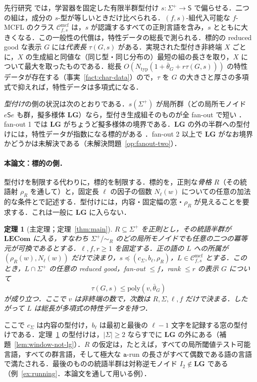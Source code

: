 \documentclass[11pt,a4paper]{ltjsarticle}
\numberwithin{equation}{section}
\theoremstyle{plain}
\theoremstyle{definition}
\theoremstyle{remark}
\theoremstyle{plain}
\newtheorem{mainthm}{定理}
\newcommand{\Cmcf}[2]{\mathcal{C}^{\mathrm{mcf}}_{#1,#2}}
\newcommand{\LG}{\mathbf{LG}}
\newcommand{\LECom}{\mathbf{L}\mathbf{ECom}}
\newcommand{\bth}{\bar\theta}
\begin{document}
先行研究 \cite{KuriyamaTCS1,KuriyamaMCFGpreprint,KuriyamaCompendium} では，学習器を固定した有限半群型付け $s:\Sigma^+\to\mathsf S$ で偏らせる．二つの組は，成分の $s$-型が等しいときだけ比べられる．$(f,s)$-組代入可能な $f$-MCFL のクラス $\Cmcf{f}{s}$ は，$s$ が認識するすべての正則言語を含み，$s$ とともに大きくなる．この一般性の代償は，特性データの総長で測られる．標的の reduced good な表示 $G$ には\emph{代表長} $\tau(G,s)$ がある．実現された型付き非終端 $X$ ごとに，$X$ の生成組と同値な（同じ型・同じ分布の）最短の組の長さを取り，$X$ について最大を取ったものである．総長 $O(N_{\mathrm{typ}}(1+\bth_G+r\tau(G,s)))$ の特性データが存在する（事実~\ref{fact:char-data}）ので，$\tau$ を $G$ の大きさと厚さの多項式で抑えれば，特性データは多項式になる．

\emph{型付け}の側の状況は次のとおりである．$s(\Sigma^+)$ が局所群（どの局所モノイド $e\mathsf Se$ も群，擬多様体 $\LG$）なら，型付き生成組そのものが全 fan-out で短い \cite{KuriyamaCompendium}．fan-out 1 では $\LG$ がちょうど擬多様体の境界である．$\LG$ の外の半群への型付けには，特性データが指数になる標的がある \cite{KuriyamaTCS1,KuriyamaTypingClass}．fan-out 2 以上で $\LG$ がなお境界かどうかは未解決である（未解決問題~\ref{op:fanout-two}）．

\paragraph{本論文：標的の側．}
型付けを制限する代わりに，標的を制限する．標的を，正則な\emph{骨格} $R$（その統語射 $\rho_R$ を通して）と，固定長 $\ell$ の因子の個数 $N_\ell(w)$ についての任意の加法的な条件とで記述する．型付けには，内容・固定幅の窓・$\rho_R$ が見えることを要求する．これは一般に $\LG$ に入らない．

\begin{mainthm}[主定理；定理~\ref{thm:main}]
\label{thm:A}
$R\subseteq\Sigma^+$ を正則とし，その統語半群が $\LECom$ に入る，すなわち $\Sigma^+/{\sim_R}$ のどの局所モノイドでも任意の二つの冪等元が可換であるとする．$\ell,f,r\ge1$ を固定する．正の語の $L$ への所属が $(\rho_R(w),N_\ell(w))$ だけで決まり，$s\preceq(c_\Sigma,b_\ell,\rho_R)$，$L\in\Cmcf{f}{s}$ とする．このとき，$L\cap\Sigma^+$ の任意の reduced good，fan-out $\le f$，rank $\le r$ の表示 $G$ について
\[
  \tau(G,s)\le\mathrm{poly}(v,\bth_G)
\]
が成り立つ．ここで $v$ は非終端の数で，次数は $R,\Sigma,\ell,f$ だけで決まる．したがって $L$ は総長が多項式の特性データを持つ．
\end{mainthm}

ここで $c_\Sigma$ は内容の型付け，$b_\ell$ は最初と最後の $\ell-1$ 文字を記録する窓の型付けである．定理~\ref{thm:A} の型付けは，$|\Sigma|\ge2$ ならすでに $\LG$ の外にある（補題~\ref{lem:window-not-lg}）．$R$ の仮定は，たとえば，すべての局所閾値テスト可能言語，すべての群言語，そして極大な $\mathtt a$-run の長さがすべて偶数である語の言語で満たされる．最後のものの統語半群は対称逆モノイド $I_2\notin\LG$ である（例~\ref{ex:running}．本論文を通して用いる例）．
\end{document}
